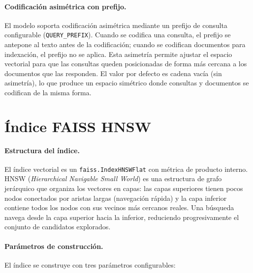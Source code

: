 \documentclass[11pt]{article}
\begin{document}
\paragraph{Codificación asimétrica con prefijo.}
El modelo soporta codificación asimétrica mediante un prefijo de consulta configurable
(\texttt{QUERY\_PREFIX}). Cuando se codifica una consulta, el prefijo se antepone al texto
antes de la codificación; cuando se codifican documentos para indexación, el prefijo no se
aplica. Esta asimetría permite ajustar el espacio vectorial para que las consultas queden
posicionadas de forma más cercana a los documentos que las responden. El valor por defecto
es cadena vacía (sin asimetría), lo que produce un espacio simétrico donde consultas y
documentos se codifican de la misma forma.

\section{Índice FAISS HNSW}

\paragraph{Estructura del índice.}
El índice vectorial es un \texttt{faiss.IndexHNSWFlat} con métrica de producto interno.
HNSW (\emph{Hierarchical Navigable Small World}) es una estructura de grafo jerárquico que
organiza los vectores en capas: las capas superiores tienen pocos nodos conectados por aristas
largas (navegación rápida) y la capa inferior contiene todos los nodos con sus vecinos más
cercanos reales. Una búsqueda navega desde la capa superior hacia la inferior, reduciendo
progresivamente el conjunto de candidatos explorados.

\paragraph{Parámetros de construcción.}
El índice se construye con tres parámetros configurables:
\end{document}
